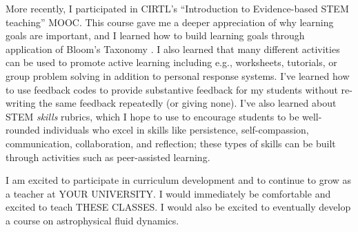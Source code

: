 \documentclass[11pt]{article}
\begin{document}
More recently, I participated in CIRTL's ``Introduction to Evidence-based STEM teaching'' MOOC.
This course gave me a deeper appreciation of why learning goals are important, and I learned how to build learning goals through application of Bloom's Taxonomy \citep{simon_taylor_2008}.
I also learned that many different activities can be used to promote active learning including e.g., worksheets, tutorials, or group problem solving in addition to personal response systems.
I've learned how to use feedback codes to provide substantive feedback for my students without re-writing the same feedback repeatedly (or giving none).
I've also learned about STEM \emph{skills} rubrics, which I hope to use to encourage students to be well-rounded individuals who excel in skills like persistence, self-compassion, communication, collaboration, and reflection; these types of skills can be built through activities such as peer-assisted learning.


I am excited to participate in curriculum development and to continue to grow as a teacher at YOUR UNIVERSITY.
I would immediately be comfortable and excited to teach THESE CLASSES.
I would also be excited to eventually develop a course on astrophysical fluid dynamics.


{\scriptsize

}
\end{document}

